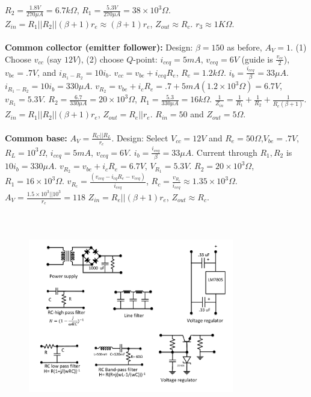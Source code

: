 $R_2 = {\frac {1.8V} {270 \mu A}}= 6.7 k \Omega$,
$R_1 = {\frac {5.3V} {270 \mu A}}= 
38 \times 10^3 \Omega$.
$Z_{in}= R_1 || R_2 || (\beta+1) r_e \approx(\beta+1)r_e$, $Z_{out} \approx R_c$.  $r_3 \approx 1K\Omega$.
\\
\\
{\bf Common collector (emitter follower):} 
Design: $\beta = 150$ as before, $A_V = 1$.
(1) Choose $v_{cc}$ (say $12V$), (2) choose $Q$-point:
$i_{ceq}= 5 mA$, $v_{ceq}= 6V$  (guide is ${\frac {v_{cc}} 2}$), $v_{be}=.7V$,
and $i_{R_1-R_2} = 10 i_b$.
$v_{cc} = v_{be} + i_{ceq} R_e$, $R_e= 1.2 k \Omega$.
$i_b = {\frac {i_{ceq}} {\beta}} = 33 \mu A$.
$i_{R_1-R_2}= 10 i_b = 330 \mu A$.
$v_{R_2} = v_{be} + i_c R_e = .7 + 5 mA (1.2 \times 10^3 \Omega) = 6.7V$,
$v_{R_1}= 5.3V$.
$R_2 = {\frac {6.7} {330 \mu A}} = 20 \times 10^3 \Omega$,
$R_1 = {\frac {5.3} {330 \mu A}} = 16k \Omega$.
${\frac 1 {Z_{in}}} = {\frac 1 {R_{1}}} +
{\frac 1 {R_{2}}} + {\frac 1 {R_{e} ( \beta + 1)}}$.
$Z_{in} = R_1 || R_2 || (\beta+1)r_e$, $Z_{out} = R_e || r_e$.
$R_{in} = 50$ and $Z_{out} = 5 \Omega$.
\\
\\
{\bf Common base:}
$A_V= {\frac {R_C ||R_L} {r_e}}$.
Design: Select $V_{cc} = 12V$ and $R_e= 50 \Omega$,$V_{be}=.7V$,
$R_L=10^3 \Omega$, $i_{ceq} = 5 mA$, $v_{ceq}= 6V$.
$i_b={\frac {i_{ceq}} {\beta}}=33 \mu A$.  Current through
$R_1, R_2$ is $10 i_b= 330 \mu A$.  $v_{R_2}= v_{be} + i_c R_e = 6.7V$, $V_{R_1}= 5.3V$.
$R_2 = 20 \times 10^3 \Omega$, $R_1 = 16 \times 10^3 \Omega$.
$v_{R_c}= {\frac {(v_{ceq}- i_{cq} R_e -v_{ceq})} {i_{ceq}}}$,
$R_c = {\frac {v_{R_c}} {i_{ceq}}} \approx 1.35 \times 10^3 \Omega$.
$A_V= {\frac {1.5 \times 10^3 || 10^3} {r_e}}=118$
$Z_{in} = R_e || (\beta+1)r_e$, $Z_{out} \approx R_c$.
\\
\\
\begin{figure} 
\center
\includegraphics[width=0.8\textwidth,natwidth=642,natheight=610, height=80mm, width=88mm]{circuit1.pdf}
\end{figure}
